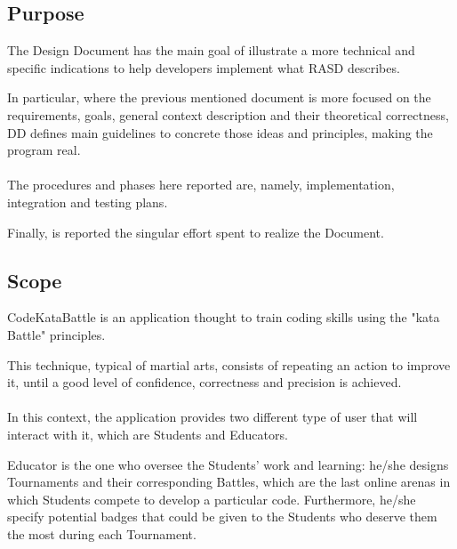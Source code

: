 \subsection{Purpose}
The Design Document has the main goal of illustrate a more technical and specific indications to help developers implement what RASD describes.

In particular, where the previous mentioned document is more focused on the requirements, goals, general context description and their theoretical correctness, DD defines main guidelines to concrete those ideas and principles, 
making the program real.\\
\\
The procedures and phases here reported are, namely, implementation, integration and testing plans.

Finally, is reported the singular effort spent to realize the Document.

\subsection{Scope}
CodeKataBattle is an application thought to train coding skills using the "kata Battle" principles. 

This technique, typical of martial arts, consists of repeating an action to improve it, until a good level of confidence, correctness and precision is achieved.\\
\\
In this context, the application provides two different type of user that will interact with it, which are Students and Educators.

Educator is the one who oversee the Students' work and learning: he/she designs Tournaments and their corresponding Battles, which are the last online arenas in which Students compete to develop a particular code. Furthermore, 
he/she specify potential badges that could be given to the Students who deserve them the most during each Tournament.

